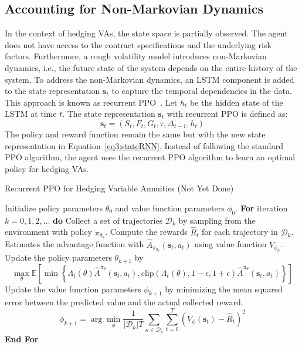 \subsection{Accounting for Non-Markovian Dynamics}

In the context of hedging VAs, the state space is partially observed.
The agent does not have access to the contract specifications and the underlying risk factors.
Furthermore, a rough volatility model introduces non-Markovian dynamics, i.e., the future state of the system depends on the entire history of the system.
To address the non-Markovian dynamics, an LSTM component is added to the state representation $\mathbf{s}_t$ to capture the temporal dependencies in the data.
This approach is known as recurrent PPO~\citep{ni2021recurrent}.
Let $h_t$ be the hidden state of the LSTM at time $t$.
The state representation $\mathbf{s}_t$ with recurrent PPO is defined as:
\begin{equation} \label{eq3:stateRNN}
    \mathbf{s}_t = (S_t, F_t, G_t, \tau, \Delta_{t-1}, h_t)
\end{equation}
The policy and reward function remain the same but with the new state representation in Equation~\ref{eq3:stateRNN}.
Instead of following the standard PPO algorithm, the agent uses the recurrent PPO algorithm to learn an optimal policy for hedging VAs.

\begin{algorithm} 
    \caption{Recurrent PPO for Hedging Variable Annuities (Not Yet Done)} 
    \begin{algorithmic}[1] \label{alg3:ppoHedging-rnn}
        \STATE  Initialize policy parameters $\theta_0$ and value function parameters $\phi_0$.
        \STATE  \textbf{For} {iteration $k=0, 1,2,\ldots$} \textbf{do}
        \STATE  \quad Collect a set of trajectories $\mathcal{D}_k$ by sampling from the environment with policy $\pi_{\theta_{k}}$.
        \STATE  \quad Compute the rewards $\hat{R}_t$ for each trajectory in $\mathcal{D}_k$.
        \STATE  \quad Estimates the advantage function with $\hat{A}_{\pi_{\theta_k}}(\mathbf{s}_t, a_t)$ using value function $V_{\phi_k}$.
        \STATE  \quad Update the policy parameters $\theta_{k+1}$ by 
        \begin{equation*}
            \max_{\theta} \mathbb{E}\left[ \min \left\{ \Lambda_t(\theta)\hat{A}^{\pi_{\theta}}(\mathbf{s}_t, a_t), \text{clip}(\Lambda_t(\theta), 1-\epsilon, 1 + \epsilon) \hat{A}^{\pi_{\theta}}(\mathbf{s}_t, a_t)  \right\} \right]
        \end{equation*}
        \STATE  \quad Update the value function parameters $\phi_{k+1}$ by minimizing the mean squared error between the predicted value and the actual collected reward.
        \begin{equation*}
            \phi_{k+1} = \arg \min_{\phi} \frac{1}{|\mathcal{D}_k|T} \sum_{\mathcal{\kappa} \in \mathcal{D}_k} \sum_{t=0}^{T} \left( V_{\phi}(\mathbf{s}_t) - \hat{R}_t \right)^2
        \end{equation*}
        \STATE  \textbf{End For}
    \end{algorithmic}
\end{algorithm}

